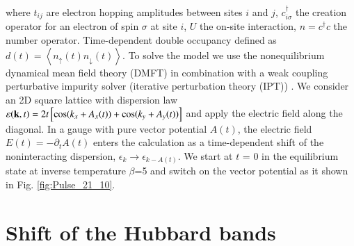 where $t_{ij}$ are electron hopping amplitudes between sites $i$ and $j$, $c^\dagger_{i\sigma}$ the creation operator for an electron of spin $\sigma$ at site $i$, $U$ the on-site interaction, $n=c^\dagger c$ the number operator. Time-dependent double occupancy defined as $d(t)= \left\langle  {n}_{\uparrow}(t) {n}_{\downarrow}(t) \right\rangle $.  To solve the model we use the nonequilibrium dynamical mean field theory (DMFT) \cite{RevModPhys_NEDMFT} in combination with a weak coupling perturbative impurity solver (iterative perturbation theory (IPT)) \cite{RevModPhys_DMFT,Damping_of_BO}. We consider an 2D square lattice with dispersion law $\varepsilon({\bf k},t)=2t\left[{\rm cos}(k_x+A_x(t))+{\rm cos}(k_y+A_y(t))\right]$ and apply the electric field along the diagonal. In a gauge with pure vector potential $A(t)$, the electric field $E(t)=-\partial_t A(t)$ enters the calculation as a time-dependent shift of the noninteracting dispersion, $\epsilon_k\rightarrow \epsilon_{k-A(t)}$. We start at $t$ = 0 in the equilibrium state at inverse temperature $\beta$=5 and switch on the vector potential as it shown in Fig. \ref{fig:Pulse_21_10}.
\FloatBarrier



\FloatBarrier
\section{Shift of the Hubbard bands}

